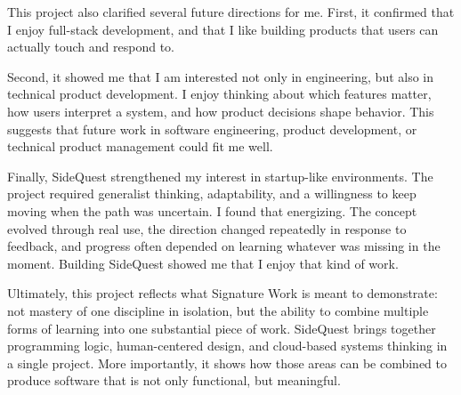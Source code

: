 \documentclass[12pt,a4paper,oneside]{report}
\begin{document}
This project also clarified several future directions for me. First, it confirmed that I enjoy full-stack development, and that I like building products that users can actually touch and respond to.

Second, it showed me that I am interested not only in engineering, but also in technical product development. I enjoy thinking about which features matter, how users interpret a system, and how product decisions shape behavior. This suggests that future work in software engineering, product development, or technical product management could fit me well.

Finally, SideQuest strengthened my interest in startup-like environments. The project required generalist thinking, adaptability, and a willingness to keep moving when the path was uncertain. I found that energizing. The concept evolved through real use, the direction changed repeatedly in response to feedback, and progress often depended on learning whatever was missing in the moment. Building SideQuest showed me that I enjoy that kind of work.

Ultimately, this project reflects what Signature Work is meant to demonstrate: not mastery of one discipline in isolation, but the ability to combine multiple forms of learning into one substantial piece of work. SideQuest brings together programming logic, human-centered design, and cloud-based systems thinking in a single project. More importantly, it shows how those areas can be combined to produce software that is not only functional, but meaningful.
\end{document}
